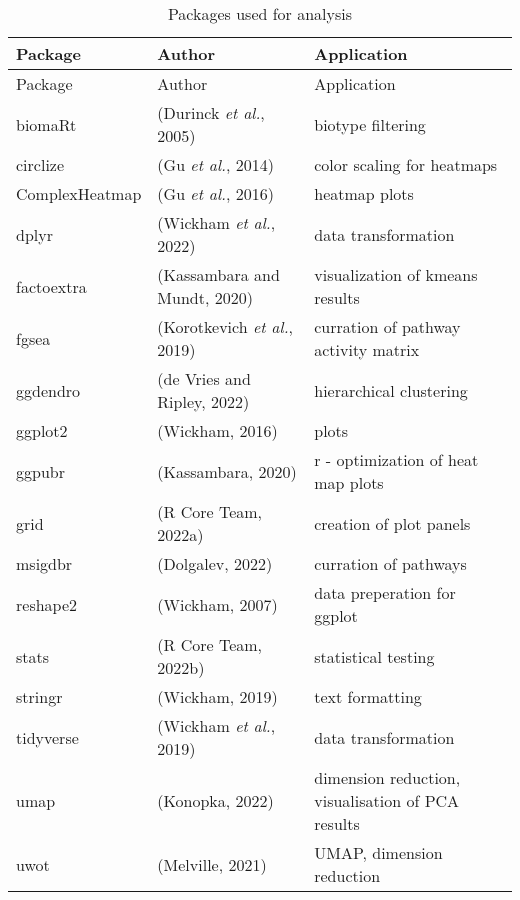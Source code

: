 \documentclass[
  parskip,
  openany]{scrreprt}
\begin{document}
\begin{longtable}[]{@{}lll@{}}
\caption{Packages used for analysis}\tabularnewline
\toprule
Package & Author & Application \\
\midrule
\endfirsthead
\toprule
Package & Author & Application \\
\midrule
\endhead
biomaRt & (Durinck \emph{et al.}, 2005) & biotype filtering \\
circlize & (Gu \emph{et al.}, 2014) & color scaling for heatmaps \\
ComplexHeatmap & (Gu \emph{et al.}, 2016) & heatmap plots \\
dplyr & (Wickham \emph{et al.}, 2022) & data transformation \\
factoextra & (Kassambara and Mundt, 2020) & visualization of kmeans
results \\
fgsea & (Korotkevich \emph{et al.}, 2019) & curration of pathway
activity matrix \\
ggdendro & (de Vries and Ripley, 2022) & hierarchical clustering \\
ggplot2 & (Wickham, 2016) & plots \\
ggpubr & (Kassambara, 2020) & r - optimization of heat map plots \\
grid & (R Core Team, 2022a) & creation of plot panels \\
msigdbr & (Dolgalev, 2022) & curration of pathways \\
reshape2 & (Wickham, 2007) & data preperation for ggplot \\
stats & (R Core Team, 2022b) & statistical testing \\
stringr & (Wickham, 2019) & text formatting \\
tidyverse & (Wickham \emph{et al.}, 2019) & data transformation \\
umap & (Konopka, 2022) & dimension reduction, visualisation of PCA
results \\
uwot & (Melville, 2021) & UMAP, dimension reduction \\
\bottomrule
\end{longtable}
\end{document}

